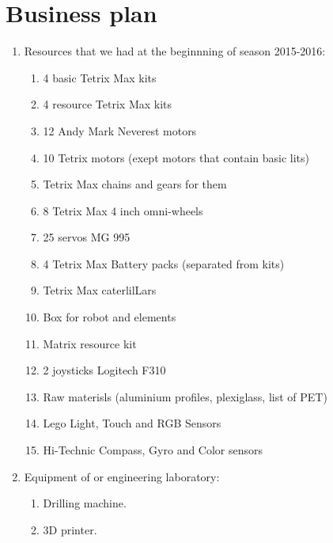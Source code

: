 \section{Business plan}
\begin{enumerate}
	\item Resources that we had at the beginnning of season 2015-2016:
	\begin{enumerate}
		\item 4 basic Tetrix Max kits
		
		\item 4 resource Tetrix Max kits
		
		\item 12 Andy Mark Neverest motors 
		
		\item 10 Tetrix motors (exept motors that contain basic lits)
		
		\item Tetrix Max chains and gears for them
		
		\item 8 Tetrix Max 4 inch omni-wheels
		
		\item 25 servos MG 995
		
		\item 4 Tetrix Max Battery packs (separated from kits)
		
		\item Tetrix Max caterlilLars
		
		\item Box for robot and elements
		
		\item Matrix resource kit
		
		\item 2 joysticks Logitech F310 
		
		\item Raw materisls (aluminium profiles, plexiglass, list of PET)
		
		\item Lego Light, Touch and RGB Sensors
		
		\item Hi-Technic Compass, Gyro and Color sensors
	\end{enumerate}
	
	\item Equipment of or engineering laboratory:
	\begin{enumerate}
		\item Drilling machine.
		
		\item 3D printer.
		

\end{enumerate}
\end{enumerate}
